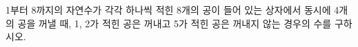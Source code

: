 1부터 8까지의 자연수가 각각 하나씩 적힌 8개의 공이 들어 있는 상자에서 동시에 4개의 공을 꺼낼 때, 1, 2가 적힌 공은 꺼내고 5가 적힌 공은 꺼내지 않는 경우의 수를 구하시오.
